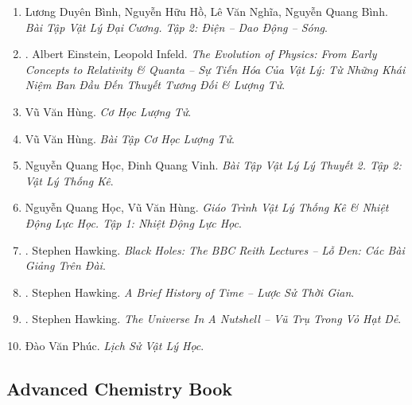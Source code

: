 \documentclass{article}
\begin{document}
\begin{enumerate}
	\item Lương Duyên Bình, Nguyễn Hữu Hồ, Lê Văn Nghĩa, Nguyễn Quang Bình. \textit{Bài Tập Vật Lý Đại Cương. Tập 2: Điện -- Dao Động -- Sóng}.
	\item \cite{Einstein_Infeld_tien_hoa_Vat_Ly}. Albert Einstein, Leopold Infeld. \textit{The Evolution of Physics: From Early Concepts to Relativity \& Quanta -- Sự Tiến Hóa Của Vật Lý: Từ Những Khái Niệm Ban Đầu Đến Thuyết Tương Đối \& Lượng Tử}.\hfill{\sf[finished]}
	\item Vũ Văn Hùng. \textit{Cơ Học Lượng Tử}.
	\item Vũ Văn Hùng. \textit{Bài Tập Cơ Học Lượng Tử}.
	\item Nguyễn Quang Học, Đinh Quang Vinh. \textit{Bài Tập Vật Lý Lý Thuyết 2. Tập 2: Vật Lý Thống Kê}.
	\item Nguyễn Quang Học, Vũ Văn Hùng. \textit{Giáo Trình Vật Lý Thống Kê \& Nhiệt Động Lực Học. Tập 1: Nhiệt Động Lực Học}.
	\item \cite{Hawking_bbc}. Stephen Hawking. \textit{Black Holes: The BBC Reith Lectures -- Lỗ Đen: Các Bài Giảng Trên Đài}.\hfill{\sf[finished]}
	\item \cite{Hawking_lstg}. Stephen Hawking. \textit{A Brief History of Time -- Lược Sử Thời Gian}.\hfill{\sf[finished]}
	\item \cite{Hawking_vttvhd}. Stephen Hawking. \textit{The Universe In A Nutshell -- Vũ Trụ Trong Vỏ Hạt Dẻ}.\hfill{\sf[finished]}
	\item Đào Văn Phúc. \textit{Lịch Sử Vật Lý Học}.
\end{enumerate}


\subsection{Advanced Chemistry Book}
\end{document}
